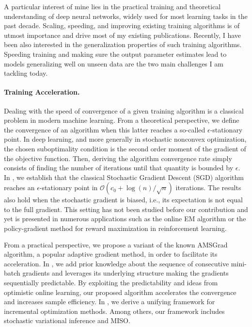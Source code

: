 \documentclass[twoside,11pt]{article}
\begin{document}
\clearpage
\vspace{0.2in}
\textbf{}
\vspace{0.2in}

A particular interest of mine lies in the practical training and theoretical understanding of deep neural networks, widely used for most learning tasks in the past decade.
Scaling, speeding, and improving existing training algorithms is of utmost importance and drive most of my existing publications.
Recently, I have been also interested in the generalization properties of such training algorithms. 
Speeding training and making sure the output parameter estimates lead to models generalizing well on unseen data are the two main challenges I am tackling today.

\vspace{0.08in}
\paragraph{Training Acceleration.} 
Dealing with the speed of convergence of a given training algorithm is a classical problem in modern machine learning.
From a theoretical perspective, we define the convergence of an algorithm when this latter reaches a so-called $\epsilon$-stationary point.
In deep learning, and more generally in stochastic nonconvex optimization, the chosen suboptimality condition is the second order moment of the gradient of the objective function. 
Then, deriving the algorithm convergence rate simply consists of finding the number of iterations until that quantity is bounded by $\epsilon$.
In \citep{karimi2019non}, we  establish that the classical Stochastic Gradient Descent (SGD) algorithm reaches an $\epsilon$-stationary point in $\mathcal{O}\left(c_{0}+\log (n) / \sqrt{n}\right)$ iterations. 
The results also hold when the stochastic gradient is biased, i.e., its expectation is not equal to the full gradient. 
This setting has not been studied before our contribution and yet is presented in numerous applications such as the online EM algorithm or the policy-gradient method for reward maximization in reinforcement learning.

From a practical perspective, we propose a variant of the known AMSGrad algorithm, a popular adaptive gradient method, in order to facilitate its acceleration.
In \citep{kun2020}, we add prior knowledge about the sequence of consecutive mini-batch gradients and leverages its underlying structure making the gradients sequentially predictable. 
By exploiting the predictability and ideas from optimistic online learning, our proposed algorithm accelerates the convergence and increases sample efficiency.
In \citep{karimi2019misso}, we derive a unifying framework for incremental optimization methods. 
Among others, our framework includes stochastic variational inference and MISO.
\end{document}

